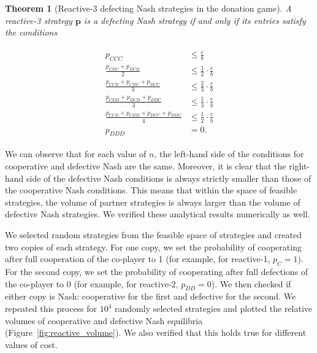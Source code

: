 \documentclass[11pt]{article}
\theoremstyle{plainCl1}
\newtheorem{theorem}{Theorem}
\theoremstyle{plainCl2}
\begin{document}
\begin{theorem}[Reactive-3 defecting Nash strategies in the donation game]
\label{theorem:reactive_three_defecting_strategies}
A reactive-3 strategy $\mathbf{p}$ is a defecting Nash strategy if and only if
its entries satisfy the conditions

\begin{align}\label{eq:three_bit_conditions_defecting}
  \begin{split}
  p_{CCC} & \le \frac{c}{b} \\
  \frac{p_{CDC} + p_{DCD}}{2} & \leq \frac{1}{2} \cdot \frac{c}{b} \\
  \frac{p_{CCD} + p_{CDC} + p_{DCC}}{3} & \leq \frac{2}{3} \cdot \frac{c}{b} \\
  \frac{p_{CDD} + p_{DCD} + p_{DDC}}{3} & \leq \frac{1}{3} \cdot \frac{c}{b} \\
  \frac{p_{CCD} + p_{CDD} + p_{DCC} + p_{DDC}}{4}  & \leq \frac{1}{2} \cdot \frac{c}{b}  \\
  p_{DDD} & = 0.
  \end{split}
\end{align}

\end{theorem}

\noindent
We can observe that for each value of \(n\), the left-hand side of the
conditions for cooperative and defective Nash are the same. Moreover, it is
clear that the right-hand side of the defective Nash conditions is always
strictly smaller than those of the cooperative Nash conditions. This means that
within the space of feasible strategies, the volume of partner strategies is
always larger than the volume of defective Nash strategies. We verified these
analytical results numerically as well.

We selected random strategies from the feasible space of strategies and created
two copies of each strategy. For one copy, we set the probability of cooperating
after full cooperation of the co-player to 1 (for example, for reactive-1, \(p_{C} = 1\)). 
For the second copy, we set the probability of cooperating after
full defections of the co-player to 0 (for example, for reactive-2, \(p_{DD} =
0\)). We then checked if either copy is Nash: cooperative for the first and
defective for the second. We repeated this process for \(10^4\) randomly
selected strategies and plotted the relative volumes of cooperative and
defective Nash equilibria (Figure~\ref{fig:reactive_volume}). We also verified
that this holds true for different values of cost.
\end{document}
